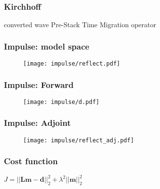 \begin{frame}
\frametitle{Kirchhoff}
\begin{algorithm}[H]
\renewcommand{\thealgorithm}{}
\tiny
\caption{converted wave Pre-Stack Time Migration operator}\label{Kirchhoff}
\begin{algorithmic}
           \EndIf
           \EndIf
         \EndFor
       \EndFor
     \EndFor
   \EndFor
\EndProcedure
\end{algorithmic}
\end{algorithm}
\end{frame}

\begin{frame}
\frametitle{Impulse: model space}
\begin{figure} 
\texttt{[image: impulse/reflect.pdf]} \\
\end{figure} 
\end{frame}

\begin{frame}
\frametitle{Impulse: Forward}
\begin{figure} 
\texttt{[image: impulse/d.pdf]} \\
\end{figure} 
\end{frame}

\begin{frame}
\frametitle{Impulse: Adjoint}
\begin{figure} 
\texttt{[image: impulse/reflect\_adj.pdf]} \\
\end{figure} 
\end{frame}

\begin{frame}
\frametitle{Cost function}
\begin{center}
$J=||\mathbf{L}\mathbf{m}-\mathbf{d}||^2_2 + \lambda^2||\mathbf{m}||^2_2$
\end{center}
\end{frame}

